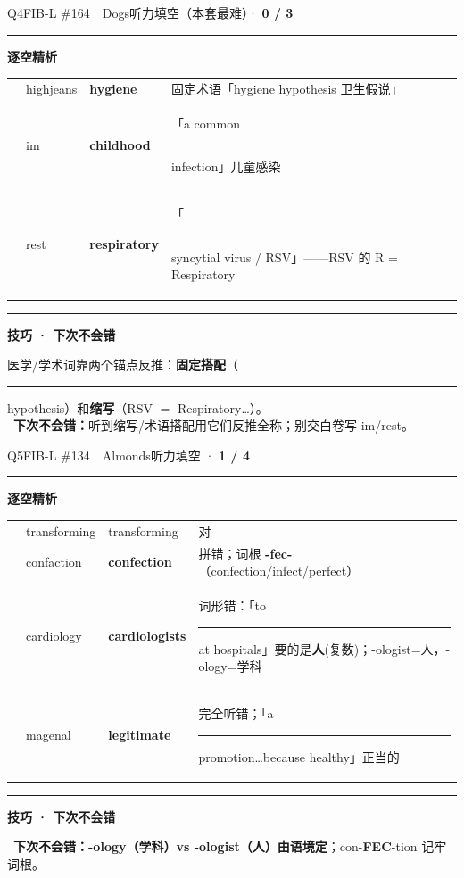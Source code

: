 \documentclass[11pt]{article}
\newcommand{\yes}{{\color{cFix}\ding{51}}}
\newcommand{\no}{{\color{cWrong}\ding{55}}}
\newcommand{\ptesub}[1]{%
  \par\needspace{2\baselineskip}\smallskip
  {\color{cAccent}\rule[-0.2ex]{3pt}{1.05em}}\hspace{6pt}%
  {\bfseries\color{cHead}#1}\par\nopagebreak\smallskip}
\begin{document}
\begin{qblock}{Q4\quad FIB-L \#164\ \ Dogs}{听力填空（本套最难）· \textcolor{cAccent}{\bfseries 0 / 3}}
\ptesub{逐空精析}
\begin{center}\small
\begin{tabular}{@{}cllp{7cm}@{}}
\no & highjeans & \textbf{hygiene} & 固定术语「hygiene hypothesis 卫生假说」\\
\no & im & \textbf{childhood} & 「a common \rule{0.8cm}{0.4pt} infection」儿童感染 \\
\no & rest & \textbf{respiratory} & 「\rule{0.8cm}{0.4pt} syncytial virus / RSV」——RSV 的 R = Respiratory \\
\end{tabular}
\end{center}
\ptesub{技巧 · 下次不会错}
\begin{notebox}\small
医学/学术词靠两个锚点反推：\textbf{固定搭配}（\rule{0.8cm}{0.4pt} hypothesis）和\textbf{缩写}（RSV $=$ Respiratory…）。\\
\yes\ \textbf{下次不会错：}听到缩写/术语搭配用它们反推全称；别交白卷写 im/rest。
\end{notebox}
\end{qblock}

\begin{qblock}{Q5\quad FIB-L \#134\ \ Almonds}{听力填空 · \textcolor{cAccent}{\bfseries 1 / 4}}
\ptesub{逐空精析}
\begin{center}\small
\begin{tabular}{@{}cllp{7cm}@{}}
\yes & transforming & transforming & 对 \\
\no & confaction & \textbf{confection} & 拼错；词根 \textbf{-fec-}（confection/infect/perfect）\\
\no & cardiology & \textbf{cardiologists} & 词形错：「to \rule{0.6cm}{0.4pt} at hospitals」要的是\textbf{人}(复数)；-ologist=人，-ology=学科 \\
\no & magenal & \textbf{legitimate} & 完全听错；「a \rule{0.6cm}{0.4pt} promotion…because healthy」正当的 \\
\end{tabular}
\end{center}
\ptesub{技巧 · 下次不会错}
\begin{notebox}\small
\yes\ \textbf{下次不会错：}\textbf{-ology（学科）vs -ologist（人）由语境定}；con-\textbf{FEC}-tion 记牢词根。
\end{notebox}
\end{qblock}
\end{document}
